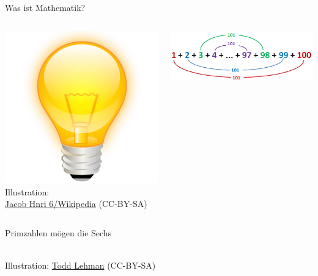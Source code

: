\documentclass[12pt,compress,ngerman,utf8,t]{beamer}
\newcommand{\withsource}[2]{\begin{center}#1\\\tiny #2\end{center}}
\begin{document}
\begin{frame}{Was ist Mathematik?}
  \pause

  \begin{columns}[c]
    \begin{column}{0.2\textwidth}
      \withsource{
        \includegraphics[width=\textwidth]{idea}
      }{
        Illustration: \\
        \href{https://commons.wikimedia.org/wiki/File:Crystal_Clear_app_ktip.svg}{Jacob
        Hnri 6/Wikipedia} (CC-BY-SA)
      }
    \end{column}

    \begin{column}{0.7\textwidth}
      \includegraphics[width=\textwidth]{kleiner-gauss}
    \end{column}
  \end{columns}
\end{frame}

\begin{frame}{Primzahlen mögen die Sechs}
  \centering
  \vspace*{-0.5em}
  \withsource{}{Illustration:
  \href{https://tex.stackexchange.com/a/44920/32372}{Todd Lehman} (CC-BY-SA)}
\end{frame}
\end{document}
